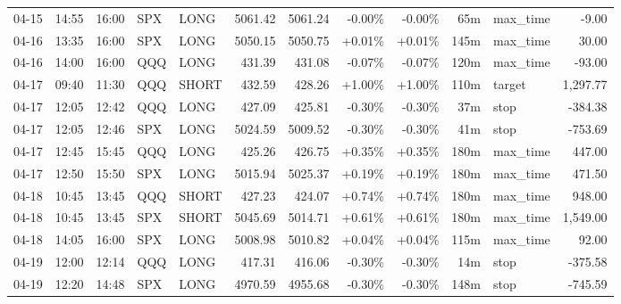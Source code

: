 \documentclass[11pt,a4paper,twoside]{article}
\begin{document}
\begin{center}
\begin{longtable}{>{\color{txtmain}}l l l l l r r r r r >{\color{txtmain}}l r}
04-15 & 14:55 & 16:00 & SPX & LONG & 5061.42 & 5061.24 & \textcolor{lossred}{-0.00\%} & \textcolor{lossred}{-0.00\%} & 65m & max\_time & \textcolor{lossred}{-9.00} \\
04-16 & 13:35 & 16:00 & SPX & LONG & 5050.15 & 5050.75 & \textcolor{wingreen}{+0.01\%} & \textcolor{wingreen}{+0.01\%} & 145m & max\_time & \textcolor{wingreen}{30.00} \\
04-16 & 14:00 & 16:00 & QQQ & LONG & 431.39 & 431.08 & \textcolor{lossred}{-0.07\%} & \textcolor{lossred}{-0.07\%} & 120m & max\_time & \textcolor{lossred}{-93.00} \\
04-17 & 09:40 & 11:30 & QQQ & SHORT & 432.59 & 428.26 & \textcolor{wingreen}{+1.00\%} & \textcolor{wingreen}{+1.00\%} & 110m & target & \textcolor{wingreen}{1,297.77} \\
04-17 & 12:05 & 12:42 & QQQ & LONG & 427.09 & 425.81 & \textcolor{lossred}{-0.30\%} & \textcolor{lossred}{-0.30\%} & 37m & stop & \textcolor{lossred}{-384.38} \\
04-17 & 12:05 & 12:46 & SPX & LONG & 5024.59 & 5009.52 & \textcolor{lossred}{-0.30\%} & \textcolor{lossred}{-0.30\%} & 41m & stop & \textcolor{lossred}{-753.69} \\
04-17 & 12:45 & 15:45 & QQQ & LONG & 425.26 & 426.75 & \textcolor{wingreen}{+0.35\%} & \textcolor{wingreen}{+0.35\%} & 180m & max\_time & \textcolor{wingreen}{447.00} \\
04-17 & 12:50 & 15:50 & SPX & LONG & 5015.94 & 5025.37 & \textcolor{wingreen}{+0.19\%} & \textcolor{wingreen}{+0.19\%} & 180m & max\_time & \textcolor{wingreen}{471.50} \\
04-18 & 10:45 & 13:45 & QQQ & SHORT & 427.23 & 424.07 & \textcolor{wingreen}{+0.74\%} & \textcolor{wingreen}{+0.74\%} & 180m & max\_time & \textcolor{wingreen}{948.00} \\
04-18 & 10:45 & 13:45 & SPX & SHORT & 5045.69 & 5014.71 & \textcolor{wingreen}{+0.61\%} & \textcolor{wingreen}{+0.61\%} & 180m & max\_time & \textcolor{wingreen}{1,549.00} \\
04-18 & 14:05 & 16:00 & SPX & LONG & 5008.98 & 5010.82 & \textcolor{wingreen}{+0.04\%} & \textcolor{wingreen}{+0.04\%} & 115m & max\_time & \textcolor{wingreen}{92.00} \\
04-19 & 12:00 & 12:14 & QQQ & LONG & 417.31 & 416.06 & \textcolor{lossred}{-0.30\%} & \textcolor{lossred}{-0.30\%} & 14m & stop & \textcolor{lossred}{-375.58} \\
04-19 & 12:20 & 14:48 & SPX & LONG & 4970.59 & 4955.68 & \textcolor{lossred}{-0.30\%} & \textcolor{lossred}{-0.30\%} & 148m & stop & \textcolor{lossred}{-745.59} \\

\end{longtable}
\end{center}
\end{document}
